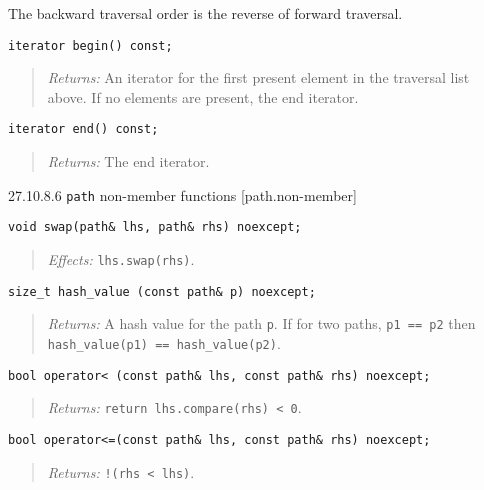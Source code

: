 The backward traversal order is the reverse of forward traversal.

\begin{verbatim}
iterator begin() const;
\end{verbatim}

\begin{quote}
\emph{Returns:} An iterator for the first present element in the
traversal list above. If no elements are present, the end iterator.
\end{quote}

\begin{verbatim}
iterator end() const;
\end{verbatim}

\begin{quote}
\emph{Returns:} The end iterator.
\end{quote}

27.10.8.6 \texttt{path} non-member functions {[}path.non-member{]}

\begin{verbatim}
void swap(path& lhs, path& rhs) noexcept;
\end{verbatim}

\begin{quote}
\emph{Effects:} \texttt{lhs.swap(rhs)}.
\end{quote}

\begin{verbatim}
size_t hash_value (const path& p) noexcept;
\end{verbatim}

\begin{quote}
\emph{Returns:} A hash value for the path \texttt{p}. If for two paths,
\texttt{p1\ ==\ p2} then \texttt{hash\_value(p1)\ ==\ hash\_value(p2)}.
\end{quote}

\begin{verbatim}
bool operator< (const path& lhs, const path& rhs) noexcept;
\end{verbatim}

\begin{quote}
\emph{Returns:} \texttt{return\ lhs.compare(rhs)\ \textless{}\ 0}.
\end{quote}

\begin{verbatim}
bool operator<=(const path& lhs, const path& rhs) noexcept;
\end{verbatim}

\begin{quote}
\emph{Returns:} \texttt{!(rhs\ \textless{}\ lhs)}.
\end{quote}

